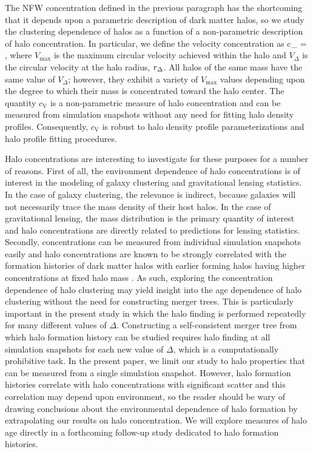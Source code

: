 \documentclass[usenatbib,usegraphicx,letterpaper]{mn2e}
\begin{document}
The NFW concentration defined in the previous paragraph has the shortcoming that it 
depends upon a parametric description of dark matter halos, so we study the clustering dependence 
of halos as a function of a non-parametric description of halo concentration. In particular, we 
define the velocity concentration as 
\beq
c_{} = , 
\eeq
where $V_{\mathrm{max}}$ is the maximum circular velocity achieved within the halo and $V_{\Delta}$ is 
the circular velocity at the halo radius, $r_{\Delta}$. All halos of the same mass have the same value of $V_{\Delta}$; however, 
they exhibit a variety of $V_{\mathrm{max}}$ values depending upon the degree to which their mass is concentrated toward 
the halo center. The quantity $c_{\mathrm{V}}$ is a non-parametric measure of halo concentration and can be measured from 
simulation snapshots without any need for fitting halo density profiles. Consequently, $c_{\mathrm{V}}$ is robust to halo density 
profile parameterizations and halo profile fitting procedures. 


Halo concentrations are interesting to investigate for these purposes for a number of reasons. 
First of all, the environment dependence of halo concentrations is of interest in the modeling of 
galaxy clustering and gravitational lensing statistics. In the case of galaxy clustering, the relevance 
is indirect, because galaxies will not necessarily trace the mass density of their host halos. In the case 
of gravitational lensing, the mass distribution is the primary quantity of interest and halo concentrations are 
directly related to predictions for lensing statistics. Secondly, concentrations can be measured from 
individual simulation snapshots easily and halo concentrations are known to be strongly correlated with 
the formation histories of dark matter halos with earlier forming halos having higher concentrations at 
fixed halo mass \citep{wechsler02, wechsler06} 
. As such, exploring the concentration dependence of halo
clustering may yield insight into the age dependence of halo clustering without the need for constructing merger
trees. This is particularly important in the present study in which the halo finding is performed repeatedly for many 
different values of $\Delta$. Constructing a self-consistent merger tree from which halo formation history can be 
studied requires halo finding at all simulation snapshots for each new value of $\Delta$, which is a computationally 
prohibitive task. In the present paper, we limit our study to halo properties that can be measured from a single simulation 
snapshot. However, halo formation histories correlate with halo concentrations with significant scatter and this correlation may 
depend upon environment, so the reader should be wary of drawing conclusions about the environmental dependence of 
halo formation by extrapolating our results on halo concentration. 
We will explore measures of halo age directly in a forthcoming follow-up study dedicated to halo 
formation histories.
\end{document}
